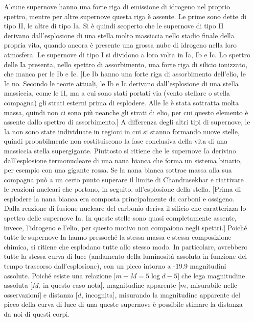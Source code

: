 \documentclass[10pt,a4paper,fleqn,draft]{article}
\begin{document}
Alcune supernove hanno una forte riga di emissione di idrogeno nel proprio
spettro, mentre per altre supernove questa riga è assente. Le prime sono dette
di tipo II, le altre di tipo Ia. Si è quindi scoperto che le supernove di tipo
II derivano dall'esplosione di una stella molto massiccia nello stadio finale
della propria vita, quando ancora è presente una grossa nube di idrogeno nella
loro atmosfera. Le supernove di tipo I si dividono a loro volta in Ia, Ib e
Ic. Lo spettro delle Ia presenta, nello spettro di assorbimento, una forte riga
di silicio ionizzato, che manca per le Ib e Ic. [Le Ib hanno una forte riga di
assorbimento dell'elio, le Ic no. Secondo le teorie attuali, le Ib e Ic derivano
dall'esplosione di una stella massiccia, come le II, ma a cui sono stati portati
via (vento stellare o stella compagna) gli strati esterni prima di
esplodere. Alle Ic è stata sottratta molta massa, quindi non ci sono più neanche
gli strati di elio, per cui questo elemento è assente dallo spettro di
assorbimento.] A differenza degli altri tipi di supernove, le Ia non sono state
individuate in regioni in cui si stanno formando nuove stelle, quindi
probabilmente non costituiscono la fase conclusiva della vita di una massiccia
stella supergigante. Piuttosto si ritiene che le supernove Ia derivino
dall'esplosione termonucleare di una nana bianca che forma un sistema binario,
per esempio con una gigante rossa. Se la nana bianca sottrae massa alla sua
compagna può a un certo punto superare il limite di Chandrasekhar e riattivare
le reazioni nucleari che portano, in seguito, all'esplosione della
stella. [Prima di esplodere la nana bianca era composta principalmente da
carboni e ossigeno. Dalla reazione di fusione nucleare del carbonio deriva il
silicio che caratterizza lo spettro delle supernove Ia. In queste stelle sono
quasi completamente assente, invece, l'idrogeno e l'elio, per questo motivo non
compaiono negli spettri.] Poiché tutte le supernove Ia hanno pressoché la stessa
massa e stessa composizione chimica, si ritiene che esplodano tutte allo stesso
modo. In particolare, avrebbero tutte la stessa curva di luce (andamento della
luminosità assoluta in funzione del tempo trascorso dall'esplosione), con un
picco intorno a -19.9 magnitudini assolute. Poiché esiste una relazione
[$m-M=5\log d - 5$] che lega magnitudine assoluta [$M$, in questo caso nota],
magnitudine apparente [$m$, misurabile nelle osservazioni] e distanza [$d$,
incognita], misurando la magnitudine apparente del picco della curva di luce di
una queste supernove è possibile stimare la distanza da noi di questi corpi.
\end{document}
